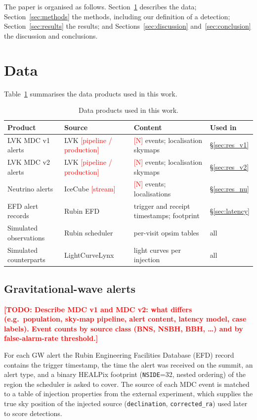 \documentclass[OPS,lsstdraft,authoryear,toc]{lsstdoc}
\newcommand{\tbd}[1]{\textcolor{red}{[#1]}}
\newcommand{\todo}[1]{\textcolor{red}{\textbf{[TODO: #1]}}}
\newcommand{\mdc}{MDC\xspace}
\begin{document}
The paper is organised as follows. Section~\ref{sec:data} describes the data; Section~\ref{sec:methods} the
methods, including our definition of a detection; Section~\ref{sec:results} the results; and
Sections~\ref{sec:discussion} and~\ref{sec:conclusion} the discussion and conclusions.

\section{Data}\label{sec:data}

Table~\ref{tab:data} summarises the data products used in this work.

\begin{table}[ht]
\centering\small
\caption{Data products used in this work.\label{tab:data}}
\begin{tabularx}{\textwidth}{l l X l}
\toprule
Product & Source & Content & Used in\\
\midrule
LVK \mdc{} v1 alerts & LVK \tbd{pipeline / production} & \tbd{N} events; localisation skymaps & \S\ref{sec:res_v1}\\
LVK \mdc{} v2 alerts & LVK \tbd{pipeline / production} & \tbd{N} events; localisation skymaps & \S\ref{sec:res_v2}\\
Neutrino alerts & IceCube \tbd{stream} & \tbd{N} events; localisations & \S\ref{sec:res_nu}\\
EFD alert records & Rubin EFD & trigger and receipt timestamps; footprint & \S\ref{sec:latency}\\
Simulated observations & Rubin scheduler & per-visit opsim tables & all\\
Simulated counterparts & LightCurveLynx & light curves per injection & all\\
\bottomrule
\end{tabularx}
\end{table}

\subsection{Gravitational-wave alerts}\label{sec:data_gw}

\todo{Describe MDC v1 and MDC v2: what differs (e.g.\ population, sky-map pipeline, alert content, latency model, case labels). Event counts by source class (BNS, NSBH, BBH, \dots) and by false-alarm-rate threshold.}

For each GW alert the Rubin Engineering Facilities Database (EFD) record contains the trigger
timestamp, the time the alert was received on the summit, an alert type, and a binary HEALPix
footprint (\texttt{NSIDE}=32, nested ordering) of the region the scheduler is asked to cover. The
source of each \mdc{} event is matched to a table of injection properties from the
external experiment, which supplies the true sky position of the injected source
(\texttt{declination}, \texttt{corrected\_ra}) used later to score detections.
\end{document}
